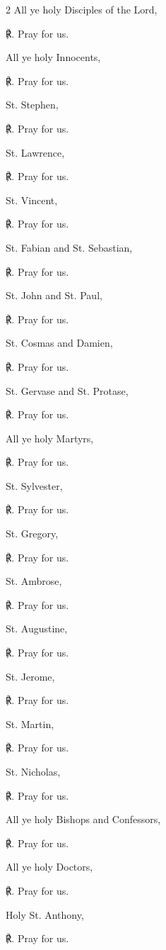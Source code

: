 \begin{multicols}{2}
All ye holy Disciples of the Lord,\par
℟. Pray for us.\par\noindent
All ye holy Innocents,\par
℟. Pray for us.\par\noindent
St. Stephen,\par
℟. Pray for us.\par\noindent
St. Lawrence,\par
℟. Pray for us.\par\noindent
St. Vincent,\par
℟. Pray for us.\par\noindent
St. Fabian and St. Sebastian,\par
℟. Pray for us.\par\noindent
St. John and St. Paul,\par
℟. Pray for us.\par\noindent
St. Cosmas and Damien,\par
℟. Pray for us.\par\noindent
St. Gervase and St. Protase,\par
℟. Pray for us.\par\noindent
All ye holy Martyrs,\par
℟. Pray for us.\par\noindent
St. Sylvester,\par
℟. Pray for us.\par\noindent
St. Gregory,\par
℟. Pray for us.\par\noindent
St. Ambrose,\par
℟. Pray for us.\par\noindent
St. Augustine,\par
℟. Pray for us.\par\noindent
St. Jerome,\par
℟. Pray for us.\par\noindent
St. Martin,\par
℟. Pray for us.\par\noindent
St. Nicholas,\par
℟. Pray for us.\par\noindent
All ye holy Bishops and Confessors,\par
℟. Pray for us.\par\noindent
All ye holy Doctors,\par
℟. Pray for us.\par\noindent
Holy St. Anthony,\par
℟. Pray for us.\par\noindent

\end{multicols}
